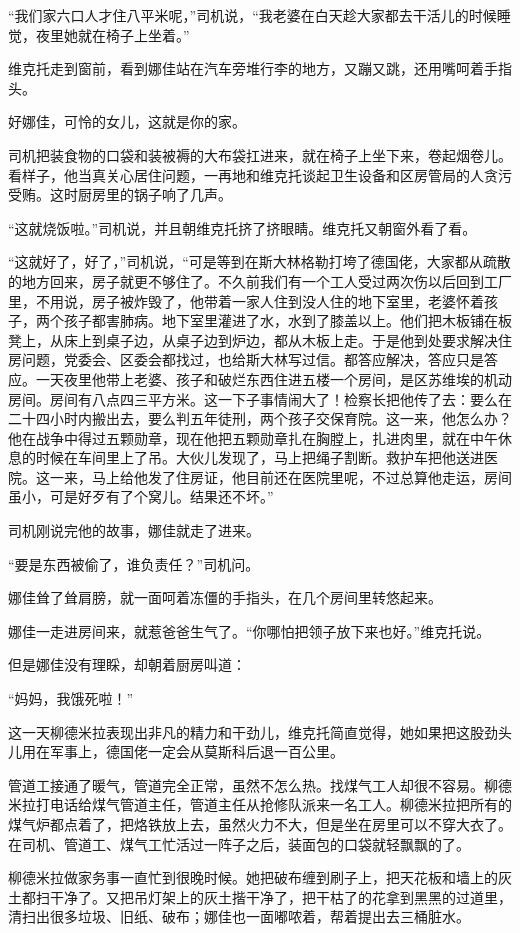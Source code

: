 “我们家六口人才住八平米呢，”司机说，“我老婆在白天趁大家都去干活儿的时候睡觉，夜里她就在椅子上坐着。”

维克托走到窗前，看到娜佳站在汽车旁堆行李的地方，又蹦又跳，还用嘴呵着手指头。

好娜佳，可怜的女儿，这就是你的家。

司机把装食物的口袋和装被褥的大布袋扛进来，就在椅子上坐下来，卷起烟卷儿。看样子，他当真关心居住问题，一再地和维克托谈起卫生设备和区房管局的人贪污受贿。这时厨房里的锅子响了几声。

“这就烧饭啦。”司机说，并且朝维克托挤了挤眼睛。维克托又朝窗外看了看。

“这就好了，好了，”司机说，“可是等到在斯大林格勒打垮了德国佬，大家都从疏散的地方回来，房子就更不够住了。不久前我们有一个工人受过两次伤以后回到工厂里，不用说，房子被炸毁了，他带着一家人住到没人住的地下室里，老婆怀着孩子，两个孩子都害肺病。地下室里灌进了水，水到了膝盖以上。他们把木板铺在板凳上，从床上到桌子边，从桌子边到炉边，都从木板上走。于是他到处要求解决住房问题，党委会、区委会都找过，也给斯大林写过信。都答应解决，答应只是答应。一天夜里他带上老婆、孩子和破烂东西住进五楼一个房间，是区苏维埃的机动房间。房间有八点四三平方米。这一下子事情闹大了！检察长把他传了去：要么在二十四小时内搬出去，要么判五年徒刑，两个孩子交保育院。这一来，他怎么办？他在战争中得过五颗勋章，现在他把五颗勋章扎在胸膛上，扎进肉里，就在中午休息的时候在车间里上了吊。大伙儿发现了，马上把绳子割断。救护车把他送进医院。这一来，马上给他发了住房证，他目前还在医院里呢，不过总算他走运，房间虽小，可是好歹有了个窝儿。结果还不坏。”

司机刚说完他的故事，娜佳就走了进来。

“要是东西被偷了，谁负责任？”司机问。

娜佳耸了耸肩膀，就一面呵着冻僵的手指头，在几个房间里转悠起来。

娜佳一走进房间来，就惹爸爸生气了。“你哪怕把领子放下来也好。”维克托说。

但是娜佳没有理睬，却朝着厨房叫道：

“妈妈，我饿死啦！”

这一天柳德米拉表现出非凡的精力和干劲儿，维克托简直觉得，她如果把这股劲头儿用在军事上，德国佬一定会从莫斯科后退一百公里。

管道工接通了暖气，管道完全正常，虽然不怎么热。找煤气工人却很不容易。柳德米拉打电话给煤气管道主任，管道主任从抢修队派来一名工人。柳德米拉把所有的煤气炉都点着了，把烙铁放上去，虽然火力不大，但是坐在房里可以不穿大衣了。在司机、管道工、煤气工忙活过一阵子之后，装面包的口袋就轻飘飘的了。

柳德米拉做家务事一直忙到很晚时候。她把破布缠到刷子上，把天花板和墙上的灰土都扫干净了。又把吊灯架上的灰土揩干净了，把干枯了的花拿到黑黑的过道里，清扫出很多垃圾、旧纸、破布；娜佳也一面嘟哝着，帮着提出去三桶脏水。

